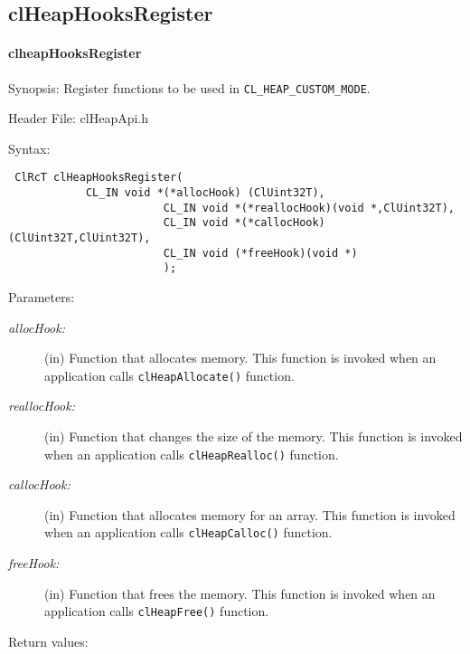 \begin{flushleft}
\subsection{clHeapHooksRegister}
\hypertarget{pageheap112}{}\paragraph{cl\-heap\-Hooks\-Register}\label{pageheap112}
\begin{Desc}
\item[Synopsis:]Register functions to be used in {\tt{CL\_\-HEAP\_\-CUSTOM\_\-MODE}}. \end{Desc}
\begin{Desc}
\item[Header File:]clHeapApi.h\end{Desc}
\begin{Desc}
\item[Syntax:]
\footnotesize
\begin{verbatim} ClRcT clHeapHooksRegister(
			CL_IN void *(*allocHook) (ClUint32T),
                     	CL_IN void *(*reallocHook)(void *,ClUint32T),
                     	CL_IN void *(*callocHook)(ClUint32T,ClUint32T),
                     	CL_IN void (*freeHook)(void *)
                     	);
\end{verbatim}
\normalsize
\end{Desc}
\begin{Desc}
\item[Parameters:]
\begin{description}
\item[{\em alloc\-Hook:}](in) Function that allocates memory. This function is invoked when an application calls
{\tt{clHeapAllocate()}} function.
\item[{\em realloc\-Hook:}](in) Function that changes the size of the memory. 
This function is invoked when an application calls {\tt{clHeapRealloc()}} function.
\item[{\em calloc\-Hook:}](in) Function that allocates memory for an
array. This function is invoked when an application calls {\tt{clHeapCalloc()}} function.
\item[{\em free\-Hook:}](in) Function that frees the
memory. This function is invoked when an application calls {\tt{clHeapFree()}} function.
\end{description}
\end{Desc}
\begin{Desc}
\item[Return values:]

\end{Desc}
\end{flushleft}
